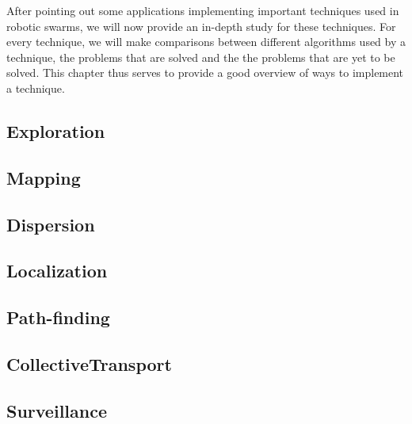 After pointing out some applications implementing important techniques used in robotic swarms, we will now provide an in-depth study for these techniques. For every technique, we will make comparisons between different algorithms used by a technique, the problems that are solved and the the problems that are yet to be solved. This chapter thus serves to provide a good overview of ways to implement a technique. 
    \subsection{Exploration}
    
    \subsection{Mapping}
    
    \subsection{Dispersion}
    
    \subsection{Localization}
    
    \subsection{Path-finding}
    
    \subsection{CollectiveTransport}
    
    \subsection{Surveillance}
    
